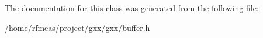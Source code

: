 The documentation for this class was generated from the following file\+:\begin{DoxyCompactItemize}
\item 
/home/rfmeas/project/gxx/gxx/buffer.\+h\end{DoxyCompactItemize}
